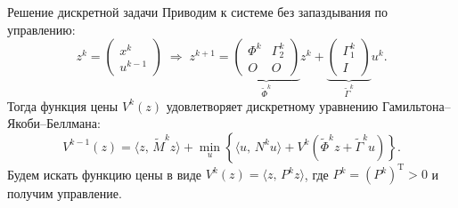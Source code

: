         \begin{frame}{Решение дискретной задачи}
                Приводим к системе без запаздывания по управлению:
                \begin{equation*}
                        z^k
                        =
                        \begin{pmatrix}
                                x^k \\ u^{k-1}
                        \end{pmatrix}
                        \;\Longrightarrow\;
                        z^{k+1}
                        =
                        \underbrace{
                                \begin{pmatrix}
                                        \Phi^k & \Gamma_2^k\\
                                        O & O
                                \end{pmatrix}
                        }_{\tilde \Phi^k}
                        z^k + \underbrace{
                                \begin{pmatrix}
                                        \Gamma_1^k \\ I
                                \end{pmatrix}
                        }_{\tilde\Gamma^k} u^k.
                \end{equation*}
                Тогда функция цены $V^k(z)$ удовлетворяет дискретному уравнению Гамильтона--Якоби--Беллмана:
                \begin{equation*}
                        V^{k-1}(z) = \langle z,\,\tilde M^k z\rangle
                        +
                        \min\limits_{u}
                        \left\{
                        \langle
                        u,\,N^k u
                        \rangle
                        +
                        V^k(\tilde\Phi^k z + \tilde\Gamma^k u)
                        \right\}.
                \end{equation*}
                Будем искать функцию цены в виде $V^k(z) = \langle z,\,P^k z \rangle$, где $P^k = (P^k)^{\mathrm{T}} > 0$ и получим управление.
        \end{frame}
